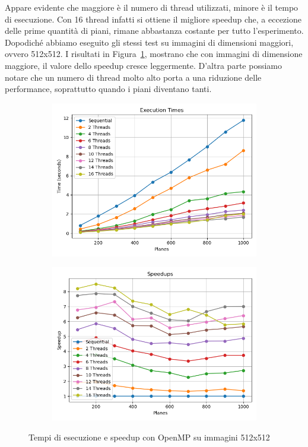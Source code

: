 Appare evidente che maggiore è il numero di thread utilizzati, minore è il tempo di esecuzione.
Con 16 thread infatti si ottiene il migliore speedup che, a eccezione delle prime quantità di piani, rimane abbastanza costante per tutto l'esperimento.\\

Dopodiché abbiamo eseguito gli stessi test su immagini di dimensioni maggiori, ovvero 512x512.
I risultati in Figura~\ref{fig:omp_512}, mostrano che con immagini di dimensione maggiore, il valore dello speedup cresce leggermente.
D'altra parte possiamo notare che un numero di thread molto alto porta a una riduzione delle performance, soprattutto quando i piani diventano tanti.
\begin{figure}[H]
    \centering
    \begin{subfigure}{0.49\textwidth}
        \centering
        \includegraphics[width=\textwidth]{../result_16/plots/512/results_times}
    \end{subfigure}
    \begin{subfigure}{0.49\textwidth}
        \centering
        \includegraphics[width=\textwidth]{../result_16/plots/512/results_speedup}
    \end{subfigure}
    \caption{Tempi di esecuzione e speedup con OpenMP su immagini 512x512}
    \label{fig:omp_512}
\end{figure}

